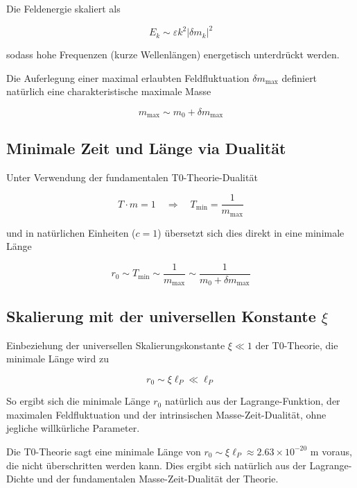 \documentclass[12pt,a4paper]{article}
\numberwithin{equation}{section}
\begin{document}
	Die Feldenergie skaliert als
	
	\begin{equation}
		E_k \sim \varepsilon k^2 |\delta m_k|^2
	\end{equation}
	
	sodass hohe Frequenzen (kurze Wellenlängen) energetisch unterdrückt werden.
	
	Die Auferlegung einer maximal erlaubten Feldfluktuation $\delta m_{\mathrm{max}}$ definiert natürlich eine charakteristische maximale Masse
	
	\begin{equation}
		m_{\mathrm{max}} \sim m_0 + \delta m_{\mathrm{max}}
	\end{equation}
	
	\subsection{Minimale Zeit und Länge via Dualität}
	
	Unter Verwendung der fundamentalen T0-Theorie-Dualität
	
	\begin{equation}
		T \cdot m = 1 \quad \Rightarrow \quad T_{\mathrm{min}} = \frac{1}{m_{\mathrm{max}}}
	\end{equation}
	
	und in natürlichen Einheiten ($c = 1$) übersetzt sich dies direkt in eine minimale Länge
	
	\begin{equation}
		r_0 \sim T_{\mathrm{min}} \sim \frac{1}{m_{\mathrm{max}}} \sim \frac{1}{m_0 + \delta m_{\mathrm{max}}}
	\end{equation}
	
	\subsection{Skalierung mit der universellen Konstante $\xi$}
	
	Einbeziehung der universellen Skalierungskonstante $\xi \ll 1$ der T0-Theorie, die minimale Länge wird zu
	
	\begin{equation}
		r_0 \sim \xi \ell_P \ll \ell_P
	\end{equation}
	
	So ergibt sich die minimale Länge $r_0$ natürlich aus der Lagrange-Funktion, der maximalen Feldfluktuation und der intrinsischen Masse-Zeit-Dualität, ohne jegliche willkürliche Parameter.
	\begin{revolutionary}
		Die T0-Theorie sagt eine minimale Länge von $r_0 \sim \xi \ell_P \approx 2.63 \times 10^{-20}$ m voraus, die nicht überschritten werden kann. Dies ergibt sich natürlich aus der Lagrange-Dichte und der fundamentalen Masse-Zeit-Dualität der Theorie.
	\end{revolutionary}
\end{document}
